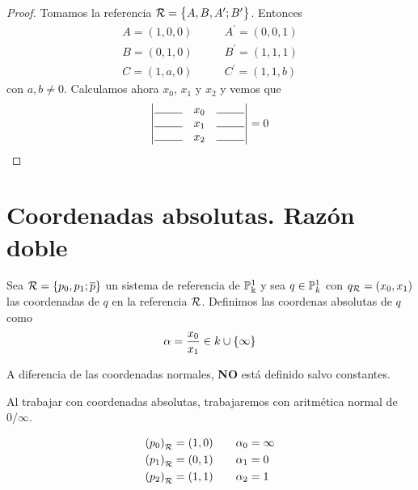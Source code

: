 \begin{proof}
Tomamos la referencia $\mathcal{R} = \left\{A,B,A^\prime;B^\prime\right\}$. Entonces
\[
\begin{aligned}
A = (1,0,0) &\qquad A^\prime = (0,0,1) \\
B = (0,1,0) &\qquad B^\prime = (1,1,1) \\
C = (1,a,0) &\qquad C^\prime = (1,1,b)
\end{aligned}
\]
con $a,b \neq 0$. Calculamos ahora $x_0$, $x_1$ y $x_
2$ y vemos que
\[
  \determinant{\line(1,0){25} & x_0 & \line(1,0){25} \\
    \line(1,0){25} & x_1 & \line(1,0){25} \\ \line(1,0){25} & x_2 & \line(1,0){25}} = 0
\]
\end{proof}


\section{Coordenadas absolutas. Razón doble}

\begin{defi}
  Sea $\mathcal{R} = \left\{p_0,p_1;\overline{p}\right\}$ un sistema de referencia de $\mathbb{P}^1_\Bbbk$ y
  sea $q \in \mathbb{P}^1_k$ con $q_{\mathcal{R}} = (x_0,x_1)$ las coordenadas de $q$ en la
  referencia $\mathcal{R}$. Definimos las coordenas absolutas de $q$ como
  \[
    \alpha = \frac{x_0}{x_1} \in k \cup \left\{\infty\right\}
  \]
\end{defi}

\begin{obs}
  A diferencia de las coordenadas normales, \textbf{NO} está definido salvo constantes.
\end{obs}
\begin{obs}
  Al trabajar con coordenadas absolutas, trabajaremos con aritmética normal de $0/\infty$.
\end{obs}
\begin{obs}
  \[
    \begin{aligned}
      \left( p_0 \right)_{\mathcal{R}} = (1,0) &\qquad \alpha_0 = \infty \\
      \left( p_1 \right)_{\mathcal{R}} = (0,1) &\qquad \alpha_1 = 0 \\
      \left( p_2 \right)_{\mathcal{R}} = (1,1) &\qquad \alpha_2 = 1 \\
    \end{aligned}
  \]
\end{obs}

